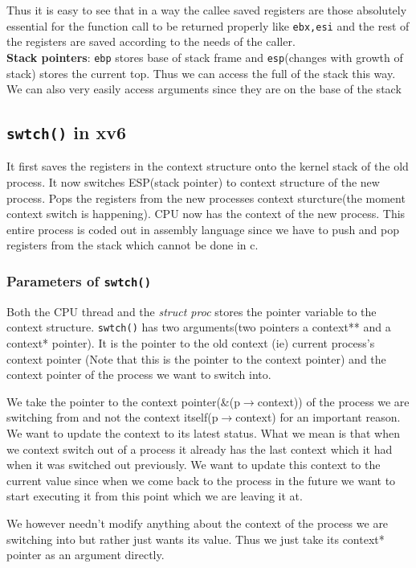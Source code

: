 \documentclass[12pt]{article}
\begin{document}
Thus it is easy to see that in a way the callee saved registers are those absolutely essential for the function call to be returned properly like \texttt{ebx,esi} and the rest of the
registers are saved according to the needs of the caller.
\\\textbf{Stack pointers}: \texttt{ebp} stores base of stack frame and \texttt{esp}(changes with growth of stack) stores the current top. Thus we can access the full of the stack this way.
We can also very easily access arguments since they are on the base of the stack

\subsection{\texttt{swtch()} in xv6}
It first saves the registers in the context structure onto the kernel stack of the old process.
It now switches ESP(stack pointer) to context structure of the new process. Pops the registers from the new processes context sturcture(the moment context switch is happening).
CPU now has the context of the new process. This entire process is coded out in assembly language since we have to push and pop
registers from the stack which cannot be done in c.



\subsubsection{Parameters of \texttt{swtch()}}
Both the CPU thread and the \textit{struct proc} stores the pointer variable to the
context structure. \texttt{swtch()} has two arguments(two pointers a context** and a context* pointer). It is the pointer to the old context (ie) current 
process's context pointer (Note that this is the pointer to the context pointer) and the context pointer of the process we want to switch into. 


We take the pointer to the context pointer(\&(p$\rightarrow$context)) of the process we are switching from and not the context itself(p$\rightarrow$context)
for an important reason. We want to update the context to its latest status. What we mean is that when we context switch out of a process it already has the last context which
it had when it was switched out previously. We want to update this context to the current value since when we come back to the process in the future we want to start executing it from
this point which we are leaving it at.

We however needn't modify anything about the context of the process we are switching into but rather just wants its value. Thus we just take its context* pointer as an argument
directly.
\end{document}
